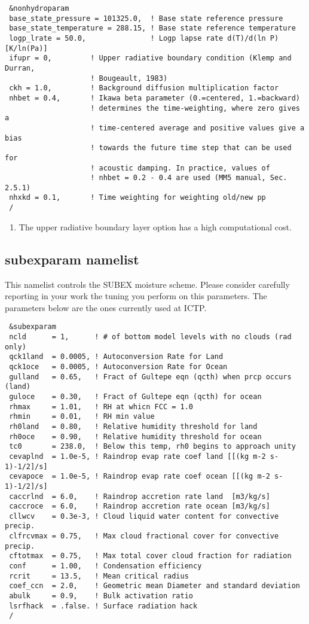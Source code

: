 {\footnotesize
\begin{Verbatim}
 &nonhydroparam
 base_state_pressure = 101325.0,  ! Base state reference pressure
 base_state_temperature = 288.15, ! Base state reference temperature
 logp_lrate = 50.0,               ! Logp lapse rate d(T)/d(ln P) [K/ln(Pa)]
 ifupr = 0,         ! Upper radiative boundary condition (Klemp and Durran,
                    ! Bougeault, 1983)
 ckh = 1.0,         ! Background diffusion multiplication factor
 nhbet = 0.4,       ! Ikawa beta parameter (0.=centered, 1.=backward)
                    ! determines the time-weighting, where zero gives a
                    ! time-centered average and positive values give a bias
                    ! towards the future time step that can be used for
                    ! acoustic damping. In practice, values of
                    ! nhbet = 0.2 - 0.4 are used (MM5 manual, Sec. 2.5.1)
 nhxkd = 0.1,       ! Time weighting for weighting old/new pp
 /
\end{Verbatim}
}

\begin{enumerate}
\item The upper radiative boundary layer option has a high computational cost.
\end{enumerate}

\subsection{subexparam namelist}

This namelist controls the SUBEX moisture scheme. Please consider carefully
reporting in your work the tuning you perform on this parameters.
The parameters below are the ones currently used at ICTP.

{\footnotesize
\begin{Verbatim}
 &subexparam
 ncld      = 1,      ! # of bottom model levels with no clouds (rad only)
 qck1land  = 0.0005, ! Autoconversion Rate for Land
 qck1oce   = 0.0005, ! Autoconversion Rate for Ocean
 gulland   = 0.65,   ! Fract of Gultepe eqn (qcth) when prcp occurs (land)
 guloce    = 0.30,   ! Fract of Gultepe eqn (qcth) for ocean
 rhmax     = 1.01,   ! RH at whicn FCC = 1.0
 rhmin     = 0.01,   ! RH min value
 rh0land   = 0.80,   ! Relative humidity threshold for land
 rh0oce    = 0.90,   ! Relative humidity threshold for ocean
 tc0       = 238.0,  ! Below this temp, rh0 begins to approach unity
 cevaplnd  = 1.0e-5, ! Raindrop evap rate coef land [[(kg m-2 s-1)-1/2]/s]
 cevapoce  = 1.0e-5, ! Raindrop evap rate coef ocean [[(kg m-2 s-1)-1/2]/s]
 caccrlnd  = 6.0,    ! Raindrop accretion rate land  [m3/kg/s]
 caccroce  = 6.0,    ! Raindrop accretion rate ocean [m3/kg/s]
 cllwcv    = 0.3e-3, ! Cloud liquid water content for convective precip.
 clfrcvmax = 0.75,   ! Max cloud fractional cover for convective precip.
 cftotmax  = 0.75,   ! Max total cover cloud fraction for radiation
 conf      = 1.00,   ! Condensation efficiency
 rcrit     = 13.5,   ! Mean critical radius
 coef_ccn  = 2.0,    ! Geometric mean Diameter and standard deviation
 abulk     = 0.9,    ! Bulk activation ratio
 lsrfhack  = .false. ! Surface radiation hack
 /
\end{Verbatim}
}

